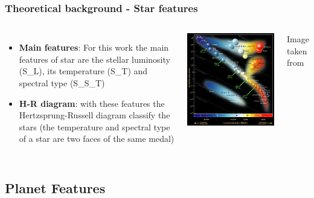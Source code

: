 \documentclass[compress]{beamer}
\begin{document}
\begin{frame}
\frametitle{Theoretical background - Star features }
\begin{columns}
\begin{itemize}
\item \textbf{Main features}: For this work the main features of star are the stellar luminosity (S\_L), its temperature (S\_T) and spectral type (S\_S\_T)
\item\textbf{H-R diagram}: with these features the Hertzsprung-Russell diagram classify the stars (the temperature and spectral type of a star are two faces of the same medal)
\end{itemize}
\includegraphics[width=\linewidth,]{Pic/S_T_T_explanation.png}
\begin{center}
Image taken from \cite{HR_diagram}
\end{center}
\end{columns}
\end{frame}

\subsection{Planet Features}
\end{document}
